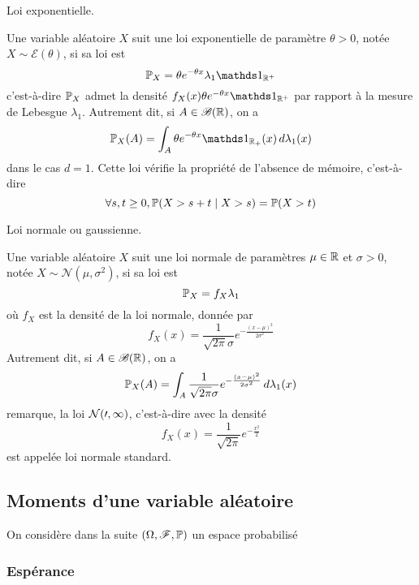 Loi exponentielle.

Une variable aléatoire \(X\) suit une loi exponentielle de paramètre \(\theta>0\), notée \(X\sim\mathcal E(\theta)\), si sa loi est
\begin{equation*}
    \bb P_X = \theta e^{-\theta x}\lambda_1\one_{\R^+}
\end{equation*}
c'est-à-dire \(\mathbb{P}_X\) admet la densité \(f_X(x)\theta e^{-\theta x}\one_{\R^+}\) par rapport à la mesure de Lebesgue \(\lambda_1\). Autrement dit,
si \(A\in\mathscr{B}(\mathbb{R})\), on a
\begin{equation*}
    \bb P_X(A) = \int_A \theta e^{-\theta x}\one_{\R_+}(x)\der\lambda_1(x)
\end{equation*}
dans le cas \(d=1\). Cette loi vérifie la propriété de l'absence de mémoire, c'est-à-dire
\begin{equation*}
    \forall s,t\geq 0, \mathbb{P}(X>s+t\mid X>s) = \mathbb{P}(X>t)
\end{equation*}


Loi normale ou gaussienne.

Une variable aléatoire \(X\) suit une loi normale de paramètres \(\mu\in\mathbb{R}\) et \(\sigma>0\), notée \(X\sim\mathcal N(\mu,\sigma^2)\), si sa loi est
\begin{equation*}
    \mathbb{P}_X = f_X\lambda_1
\end{equation*}
où \(f_X\) est la densité de la loi normale, donnée par
\begin{equation*}
    f_X(x) = \frac{1}{\sqrt{2\pi}\sigma}e^{-\frac{{(x-\mu)}^2}{2\sigma^2}}
\end{equation*}
Autrement dit, si \(A\in\mathscr{B}(\mathbb{R})\), on a
\begin{equation*}
    \mathbb{P}_X(A) = \int_A \frac{1}{\sqrt{2\pi}\sigma}e^{-\frac{{(x-\mu)}^2}{2\sigma^2}}\mathop{}\!{d}\lambda_1(x)
\end{equation*}
remarque, la loi \(\cal N(0,1)\), c'est-à-dire avec la densité
\begin{equation*}
    f_X(x) = \frac{1}{\sqrt{2\pi}}e^{-\frac{x^2}{2}}
\end{equation*}
est appelée loi normale standard.


\subsection{Moments d'une variable aléatoire} %

On considère dans la suite \(\left(\Omega, \mathscr{F}, \mathbb{P}\right)\) un
espace probabilisé

\subsubsection{Espérance} %


